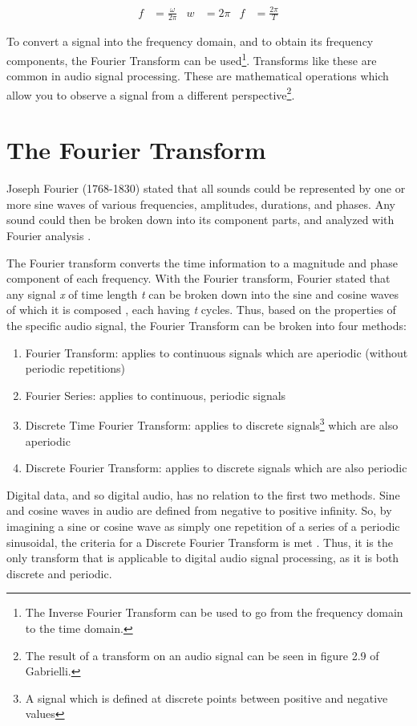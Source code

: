 \begin{align}
    f &= \frac{\omega}{2\pi} &w &= 2\pi &f &= \frac{2\pi}{T}
\end{align}

To convert a signal into the frequency domain, and to obtain its frequency components, the Fourier Transform can be used\footnote{The Inverse Fourier Transform can be used to go from the frequency domain to the time domain.}. Transforms like these are common in audio signal processing. These are mathematical operations which allow you to observe a signal from a different perspective\footnote{The result of a transform on an audio signal can be seen in figure 2.9 of Gabrielli.}.

\section{The Fourier Transform}
Joseph Fourier (1768-1830) stated that all sounds could be represented by one or more sine waves of various frequencies, amplitudes, durations, and phases. Any sound could then be broken down into its component parts, and analyzed with Fourier analysis \cite{Winer_2018}. 

The Fourier transform converts the time information to a magnitude and phase component of each frequency. With the Fourier transform, Fourier stated that any signal \textit{x} of time length \textit{t} can be broken down into the sine and cosine waves of which it is composed \cite{Zjalic_2021}, each having \textit{t} cycles. Thus, based on the properties of the specific audio signal, the Fourier Transform can be broken into four methods:

\begin{enumerate}
    \item Fourier Transform: applies to continuous signals which are aperiodic (without periodic repetitions)
    \item Fourier Series: applies to continuous, periodic signals
    \item Discrete Time Fourier Transform: applies to discrete signals\footnote{A signal which is defined at discrete points between positive and negative values} which are also aperiodic
    \item Discrete Fourier Transform: applies to discrete signals which are also periodic
\end{enumerate}

Digital data, and so digital audio, has no relation to the first two methods. Sine and cosine waves in audio are defined from negative to positive infinity. So, by imagining a sine or cosine wave as simply one repetition of a series of a periodic sinusoidal, the criteria for a Discrete Fourier Transform is met \cite{Zjalic_2021}. Thus, it is the only transform that is applicable to digital audio signal processing, as it is both discrete and periodic.

